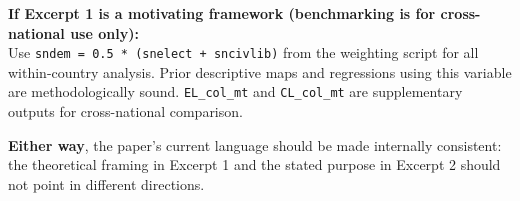 \documentclass[
]{article}
\begin{document}
\textbf{If Excerpt 1 is a motivating framework (benchmarking is for
cross-national use only):}\\
Use \texttt{sndem\ =\ 0.5\ *\ (snelect\ +\ sncivlib)} from the weighting
script for all within-country analysis. Prior descriptive maps and
regressions using this variable are methodologically sound.
\texttt{EL\_col\_mt} and \texttt{CL\_col\_mt} are supplementary outputs
for cross-national comparison.

\textbf{Either way}, the paper's current language should be made
internally consistent: the theoretical framing in Excerpt 1 and the
stated purpose in Excerpt 2 should not point in different directions.
\end{document}
